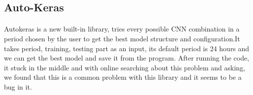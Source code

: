 \subsection{Auto-Keras}
\paragraph{}
Autokeras is a new built-in library, tries every possible CNN combination in a period chosen by the user to get the best model structure and configuration.It takes period, training, testing part as an input, its default period is 24 hours and we can get the best model and save it from the program.
After running the code, it stuck in the middle and with online searching about this problem and asking, we found that this is a common problem with this library and it seems to be a bug in it.

